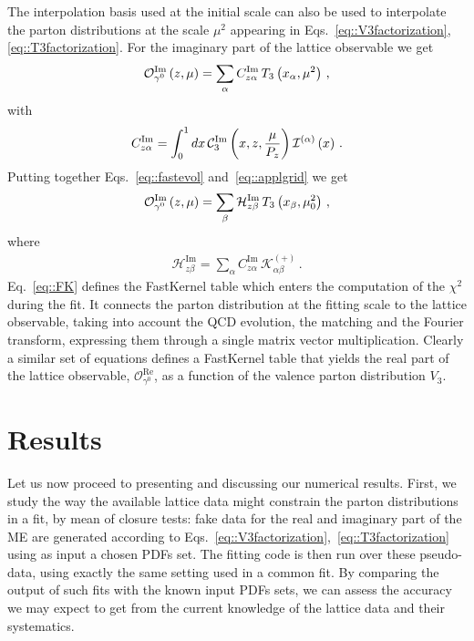 The interpolation basis used at the initial scale can also be used to
interpolate the parton distributions at the scale $\mu^2$ appearing in
Eqs.~\eqref{eq::V3factorization}, \eqref{eq::T3factorization}. For the imaginary part of the lattice observable we get
\begin{align}
	\label{eq::applgrid}             
	\mathcal{O}_{\gamma^0}^{\mathrm{Im}}\left( z,\mu \right) = 
	\sum_{\alpha} C_{z\alpha}^{\mathrm{Im}}\, 
	T_3\left(x_{\alpha},\mu^2\right)\, , 
\end{align}
with
\begin{align}
	C_{z\alpha}^{\mathrm{Im}} = \int_0^1 dx\, 
	\mathcal{C}_3^{\mathrm{Im}}\left( x, z, \frac{\mu}{P_z}\right) 
	\mathcal{I}^{(\alpha)}\left( x \right)\, . 
\end{align}
Putting together Eqs.~\eqref{eq::fastevol} and~\eqref{eq::applgrid} we get
\begin{align}
	\mathcal{O}_{\gamma^0}^{\mathrm{Im}}\left( z,\mu \right) = 
	\sum_{\beta}
	\mathcal{H}_{z\beta}^{\mathrm{Im}}\,
	T_3\left( x_{\beta}, \mu_0^2 \right)\, , 
\end{align}
where
\begin{align}
	\label{eq::FK}
	\mathcal{H}_{z\beta}^{\mathrm{Im}} = 
	\sum_{\alpha} C_{z\alpha}^{\mathrm{Im}}\, 
	\mathcal{K}^{(+)}_{\alpha\beta}\, . 
\end{align}
Eq.~\eqref{eq::FK} defines the FastKernel table which enters the computation of
the $\chi^2$ during the fit. It connects the parton distribution at the fitting
scale to the lattice observable, taking into account the QCD evolution, the
matching and the Fourier transform, expressing them through a single matrix
vector multiplication. Clearly a similar set of equations defines a FastKernel
table that yields the real part of the lattice observable,
$\mathcal{O}_{\gamma^0}^{\mathrm{Re}}$, as a function of the valence parton
distribution $V_3$.

\section{Results}
\label{sec:results}

Let us now proceed to presenting and discussing our numerical results. First, we
study the way the available lattice data might constrain the parton
distributions in a fit, by mean of closure tests: fake data for the real and
imaginary part of the ME are generated according to
Eqs.~\eqref{eq::V3factorization},~\eqref{eq::T3factorization} using as input a
chosen PDFs set. The fitting code is then run over these pseudo-data, using
exactly the same setting used in a common fit. By comparing the output of such
fits with the known input PDFs sets, we can assess the accuracy we may expect to
get from the current knowledge of the lattice data and their systematics. 

